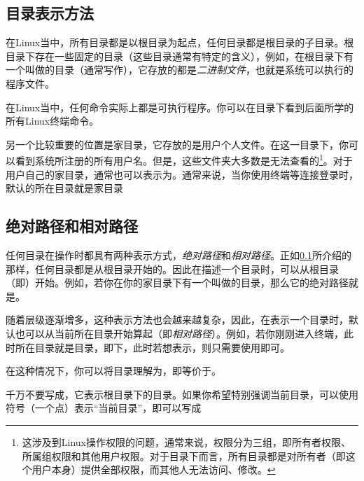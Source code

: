\subsection{目录表示方法}\label{subsec:认识Linux目录-目录表示方法}

在Linux当中，所有目录都是以根目录\code{/}为起点，任何目录都是根目录的子目录。根目录下存在一些固定的目录（这些目录通常有特定的含义），例如，在根目录下有一个叫做的目录（通常写作），它存放的都是\emph{二进制文件}，也就是系统可以执行的程序文件。

\begin{attention}
    在Linux当中，任何命令实际上都是可执行程序。你可以在目录下看到后面所学的所有Linux终端命令。
\end{attention}

另一个比较重要的位置是家目录，它存放的是用户个人文件。在这一目录下，你可以看到系统所注册的所有用户名。但是，这些文件夹大多数是无法查看的\footnote{这涉及到Linux操作权限的问题，通常来说，权限分为三组，即所有者权限、所属组权限和其他用户权限。对于目录下而言，所有目录都是对所有者（即这个用户本身）提供全部权限，而其他人无法访问、修改。}。对于用户自己的家目录，通常也可以表示为\code{\texttilde}。通常来说，当你使用终端等连接登录时，默认的所在目录就是家目录\code{\texttilde}

\subsection{绝对路径和相对路径}\label{subsec:认识Linux目录-绝对路径和相对路径}

任何目录在操作时都具有两种表示方式，\emph{绝对路径}和\emph{相对路径}。正如\ref{subsec:认识Linux目录-目录表示方法}所介绍的那样，任何目录都是从根目录开始的。因此在描述一个目录时，可以从根目录（即\code{/}）开始。例如，若你在你的家目录下有一个叫做的目录，那么它的绝对路径就是。

随着层级逐渐增多，这种表示方法也会越来越复杂，因此，在表示一个目录时，默认也可以从当前所在目录开始算起（即\emph{相对路径}）。例如，若你刚刚进入终端，此时所在目录就是\code{\texttilde}目录，即下，此时若想表示，则只需要使用即可。

\begin{attention}
    在这种情况下，你可以将目录理解为，即等价于。

    千万不要写成，它表示根目录下的目录。如果你希望特别强调当前目录，可以使用符号（一个点）表示“当前目录”，即可以写成
\end{attention}

